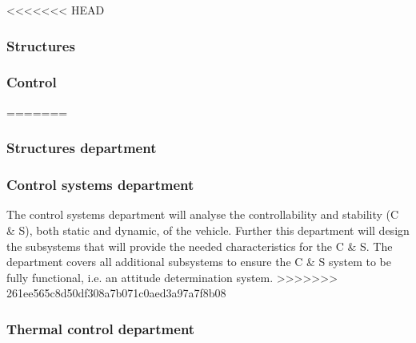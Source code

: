 <<<<<<< HEAD
\subsubsection{Structures}\label{subsec:struct}
\subsubsection{Control}\label{subsec:control}
=======
\subsubsection{Structures department}\label{subsec:struct}

\subsubsection{Control systems department}\label{subsec:control}
The control systems department will analyse the controllability and stability (C \& S), both static and dynamic, of the vehicle. Further this department will design the subsystems that will provide the needed characteristics for the C \& S. The department covers all additional subsystems to ensure the C \& S system to be fully functional, i.e. an attitude determination system.
>>>>>>> 261ee565c8d50df308a7b071c0aed3a97a7f8b08


\subsubsection{Thermal control department}\label{subsec:therm}
